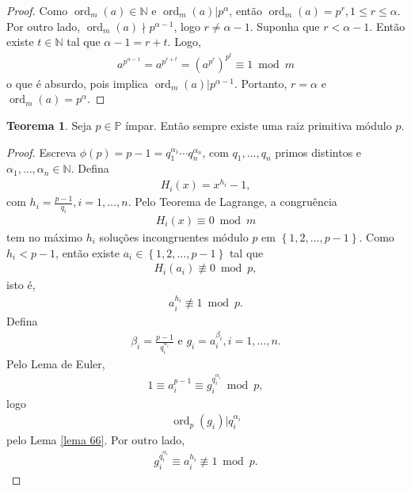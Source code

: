 \documentclass[a4paper,11pt,twoside, leqno]{article}
\DeclareMathOperator{\Ord}{ord}
\theoremstyle{definition}
\newtheorem{theorem}{Teorema}[section]
\begin{document}
\begin{proof}
	Como $\Ord_m(a)\in\mathbb{N}$ e $\Ord_m(a)|p^{\alpha}$, então $\Ord_m(a)=p^r, 1\leq r\leq \alpha$. Por outro lado, $\Ord_m(a)\nmid p^{\alpha-1}$, logo $r\neq \alpha - 1$. Suponha que $r < \alpha - 1$. Então existe $t\in\mathbb{N}$ tal que $\alpha - 1 = r+t$. Logo, 
	\begin{align*}
	a^{p^{\alpha - 1}} = a^{p^{r+t}} = \left( a^{p^r} \right)^{p^t}\equiv 1\bmod m
	\end{align*}
	o que é absurdo, pois implica $\Ord_m(a)|p^{\alpha - 1}$. Portanto, $r=\alpha$ e $\Ord_m(a) = p^{\alpha}$. 
\end{proof}
\begin{theorem}
	Seja $p\in\mathbb{P}$ ímpar. Então sempre existe uma raiz primitiva módulo $p$.
\end{theorem}
\begin{proof}
	Escreva $\phi(p) = p-1 = q_1^{\alpha_1}\cdots q_n^{\alpha_n}$, com $q_1, \dots, q_n$ primos distintos e $\alpha_1, \dots, \alpha_n\in\mathbb{N}$. Defina
	\begin{align*}
	H_i(x) = x^{h_i} - 1,
	\end{align*}
	com $\displaystyle{ h_i = \frac{p-1}{q_i} }, i=1,\dots,n$. Pelo Teorema de Lagrange, a congruência 
	\begin{align*}
	H_i(x)\equiv 0\bmod m
	\end{align*}
	tem no máximo $h_i$ soluções incongruentes módulo $p$ em $\left\{ 1,2,\dots,p-1 \right\}$. Como $h_i<p-1$, então existe $a_i\in\left\{ 1,2,\dots,p-1 \right\}$ tal que 
	\begin{align*}
	H_i(a_i)\not\equiv 0\bmod p,
	\end{align*}
	isto é, 
	\begin{align*}
	a_i^{h_i}\not\equiv 1\bmod p.
	\end{align*}
	Defina
	\begin{align*}
	\beta_i = \frac{p-1}{q_i^{\alpha_i}} \text{ e } g_i = a_i^{\beta_i}, i=1,\dots,n.
	\end{align*}
	Pelo Lema de Euler, 
	\begin{align*}
	1\equiv a_i^{p-1}\equiv g_i^{q_i^{\alpha_i}}\bmod p,
	\end{align*}
	logo
	\begin{align*}
	\Ord_p(g_i)|q_i^{\alpha_i}
	\end{align*}
	pelo Lema \eqref{lema 66}. Por outro lado, 
	\begin{align*}
	g_i^{q_i^{\alpha_i}}\equiv a_i^{h_i}\not\equiv 1\bmod p.
	\end{align*}

\end{proof}
\end{document}
